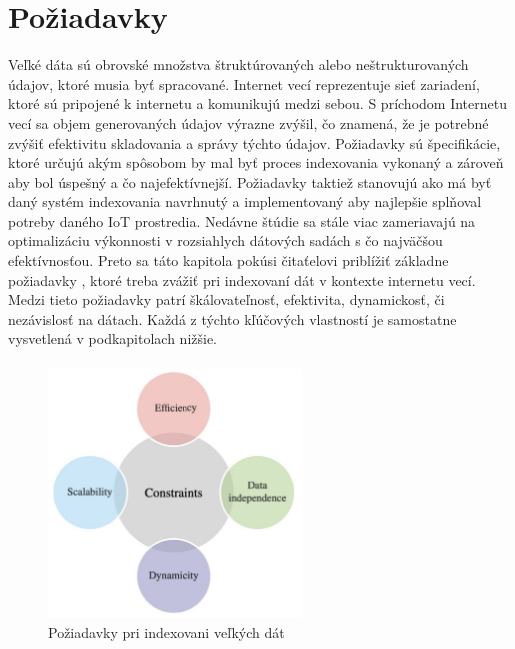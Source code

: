 \documentclass[10pt,twoside,slovak,a4paper]{article}
\begin{document}
\section{Požiadavky} \label{poziadavky}
Veľké dáta sú obrovské množstva štruktúrovaných alebo neštrukturovaných údajov, ktoré musia byť spracované. Internet vecí reprezentuje sieť zariadení, ktoré sú pripojené k internetu a komunikujú medzi sebou. S príchodom Internetu vecí sa objem generovaných údajov výrazne zvýšil, čo znamená, že je potrebné zvýšiť efektivitu skladovania a správy týchto údajov. Požiadavky sú špecifikácie, ktoré určujú akým spôsobom by mal byť proces indexovania vykonaný a zároveň aby bol úspešný a čo najefektívnejší. Požiadavky taktiež stanovujú ako má byť daný systém indexovania navrhnutý a implementovaný aby najlepšie splňoval potreby daného IoT prostredia. Nedávne štúdie sa stále viac zameriavajú na optimalizáciu výkonnosti v rozsiahlych dátových sadách s čo najväčšou efektívnosťou.\cite{2021} Preto sa táto kapitola pokúsi čitaťelovi priblížiť základne požiadavky , ktoré treba zvážiť pri indexovaní dát v kontexte internetu vecí. Medzi tieto požiadavky patrí škálovateľnosť, efektivita, dynamickosť, či nezávislosť na dátach.\cite{8807848} Každá z týchto kľúčových vlastností je samostatne vysvetlená v podkapitolach nižšie.



\paragraph{}
\begin{figure}[tbh]
    \centering
    \includegraphics[width=0.6\textwidth]{poziadavky.pdf}
\caption{Požiadavky pri indexovani veľkých dát \cite{8807848}}
\label{f:poziadavky}
\end{figure}
\end{document}
